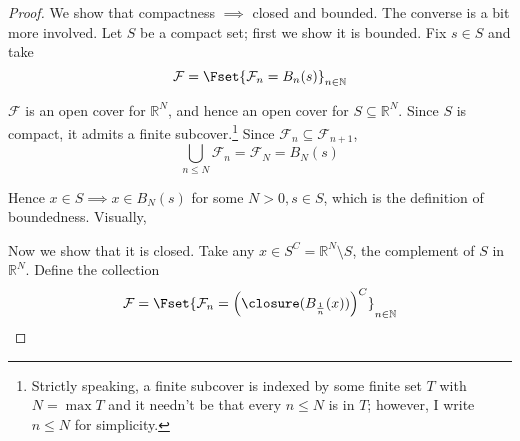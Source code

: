 \documentclass{article}
\begin{document}
\begin{proof}
  We show that compactness $\implies$ closed and bounded. The converse is a bit more involved. Let $S$ be a compact set; first we show it is bounded. Fix $s \in S$ and take
  \[
    \mathcal{F} = \Fset{\mathcal{F}_n = B_n(s)}_{n \in \mathbb{N}}
  \]

  $\mathcal{F}$ is an open cover for $\mathbb{R}^N$, and hence an open cover for $S \subseteq \mathbb{R}^N$. Since $S$ is compact, it admits a finite subcover.\footnote{Strictly speaking, a finite  subcover is indexed by some finite set $T$ with $N = \max T$ and it needn't be that every $n \le N$ is in $T$; however, I write $n \le N$ for simplicity.} Since $\mathcal{F}_n \subseteq \mathcal{F}_{n + 1}$,
  \[
    \bigcup_{n \le N} \mathcal{F}_n = \mathcal{F}_N = B_N(s)
  \]

  Hence $x \in S \implies x \in B_N(s)$ for some $N > 0, s \in S$, which is the definition of boundedness. Visually,
  \begin{figure}[H]
    \centering
  \end{figure}

  Now we show that it is closed. Take any $x \in S^C = \mathbb{R}^N \setminus S$, the complement of $S$ in $\mathbb{R}^N$. Define the collection
  \[
    \mathcal{F} = \Fset{\mathcal{F}_n = \left(\closure(B_{\frac{1}{n}}(x))\right)^C}_{n \in \mathbb{N}}
  \]


\end{proof}
\end{document}
